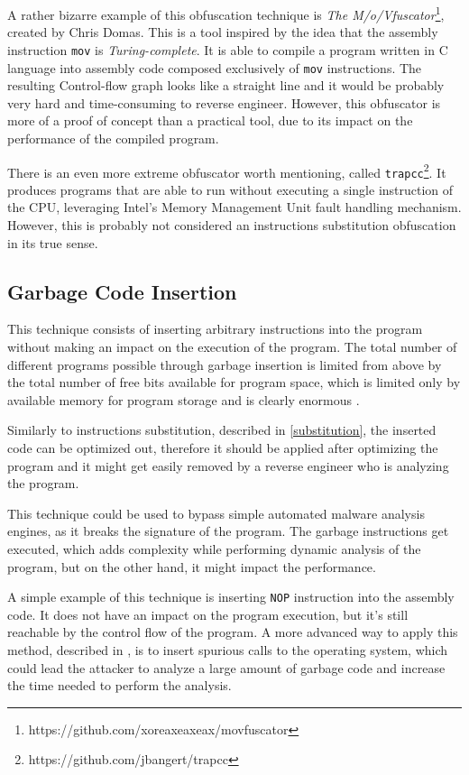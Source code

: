 \documentclass[
  digital, %
  table,   %
  twoside, %
  nolof,     %
  nolot,     %
]{fithesis3}
\theoremstyle{definition}
\begin{document}
A rather bizarre example of this obfuscation technique is \textit{The M/o/Vfuscator}\footnote{https://github.com/xoreaxeaxeax/movfuscator}, created by Chris Domas. This is a tool inspired by the idea that the assembly instruction \texttt{mov} is \textit{Turing-complete}. It is able to compile a program written in C language into assembly code composed exclusively of \texttt{mov} instructions. The resulting Control-flow graph looks like a straight line and it would be probably very hard and time-consuming to reverse engineer. However, this obfuscator is more of a proof of concept than a practical tool, due to its impact on the performance of the compiled program. 

There is an even more extreme obfuscator worth mentioning, called \texttt{trapcc}\footnote{https://github.com/jbangert/trapcc}. It produces programs that are able to run without executing a single instruction of the CPU, leveraging Intel's Memory Management Unit fault handling mechanism. However, this is probably not considered an instructions substitution obfuscation in its true sense. 

\subsection{Garbage Code Insertion} \label{garbage}
This technique consists of inserting arbitrary instructions into the program without making an impact on the execution of the program. The total number of different programs possible
through garbage insertion is limited from above by the total number of free bits available for program space, which is limited only by available memory for program storage and is clearly enormous \cite{os_protection}. 

Similarly to instructions substitution, described in \ref{substitution}, the inserted code can be optimized out, therefore it should be applied after optimizing the program and it might get easily removed by a reverse engineer who is analyzing the program. 

This technique could be used to bypass simple automated malware analysis engines, as it breaks the signature of the program. The garbage instructions get executed, which adds complexity while performing dynamic analysis of the program, but on the other hand, it might impact the performance. 

A simple example of this technique is inserting \texttt{NOP} instruction into the assembly code. It does not have an impact on the program execution, but it's still reachable by the control flow of the program. A more advanced way to apply this method, described in \cite{os_protection}, is to insert spurious calls to the operating system, which could lead the attacker to analyze a large amount of garbage code and increase the time needed to perform the analysis. 
\end{document}
